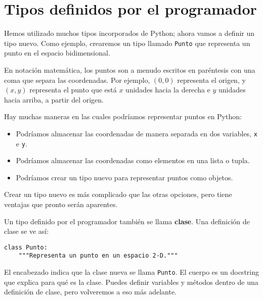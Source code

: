 \documentclass[10pt]{book}
\begin{document}
\section{Tipos definidos por el programador}
\label{point}

Hemos utilizado muchos tipos incorporados de Python; ahora vamos
a definir un tipo nuevo.  Como ejemplo, crearemos un tipo
llamado {\tt Punto} que representa un punto en el espacio
bidimensional.

En notación matemática, los puntos son a menudo escritos en
paréntesis con una coma que separa las coordenadas.  Por ejemplo,
$(0,0)$ representa el origen, y $(x,y)$ representa el
punto que está $x$ unidades hacia la derecha e $y$ unidades hacia arriba, a partir del origen.

Hay muchas maneras en las cuales podríamos representar puntos en Python:

\begin{itemize}

\item Podríamos almacenar las coordenadas de manera separada en dos
variables, {\tt x} e {\tt y}.

\item Podríamos almacenar las coordenadas como elementos en una lista
o tupla.

\item Podríamos crear un tipo nuevo para representar puntos como
objetos.

\end{itemize}

Crear un tipo nuevo
es más complicado que las otras opciones, pero
tiene ventajas que pronto serán aparentes.

Un tipo definido por el programador también se llama {\bf clase}.
Una definición de clase se ve así:

\begin{verbatim}
class Punto:
    """Representa un punto en un espacio 2-D."""
\end{verbatim}
%
El encabezado indica que la clase nueva se llama {\tt Punto}.
El cuerpo es un docstring que explica para qué es la clase.
Puedes definir variables y métodos dentro de una definición de clase,
pero volveremos a eso más adelante.
\end{document}
